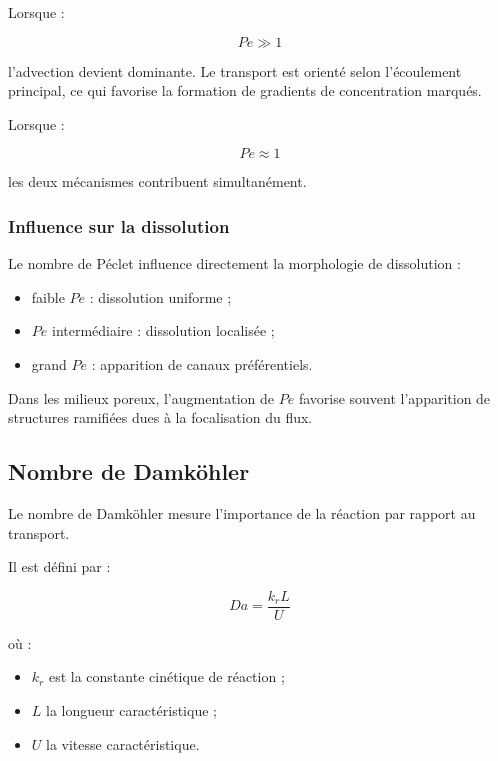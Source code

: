 \documentclass[12pt,a4paper]{report}
\begin{document}
Lorsque :

\begin{equation}
Pe \gg 1
\end{equation}

l’advection devient dominante. Le transport est orienté selon l’écoulement principal, ce qui favorise la formation de gradients de concentration marqués.

Lorsque :

\begin{equation}
Pe \approx 1
\end{equation}

les deux mécanismes contribuent simultanément.

\subsubsection{Influence sur la dissolution}

Le nombre de Péclet influence directement la morphologie de dissolution :

\begin{itemize}
\item faible $Pe$ : dissolution uniforme ;
\item $Pe$ intermédiaire : dissolution localisée ;
\item grand $Pe$ : apparition de canaux préférentiels.
\end{itemize}

Dans les milieux poreux, l’augmentation de $Pe$ favorise souvent l’apparition de structures ramifiées dues à la focalisation du flux.

\subsection{Nombre de Damköhler}

Le nombre de Damköhler mesure l’importance de la réaction par rapport au transport.

Il est défini par :

\begin{equation}
Da
=
\frac{k_rL}{U}
\end{equation}

où :

\begin{itemize}
\item $k_r$ est la constante cinétique de réaction ;
\item $L$ la longueur caractéristique ;
\item $U$ la vitesse caractéristique.
\end{itemize}
\end{document}
